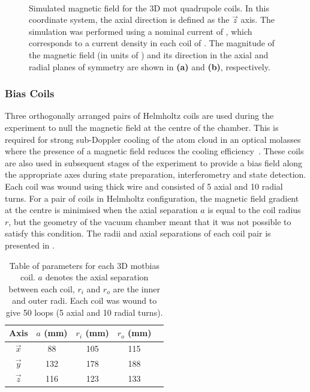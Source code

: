 \begin{figure}
	\centering
	\def\svgwidth{\columnwidth}
	\\
	\caption[Simulated magnetic field for the 3D \ac{mot} quadrupole
		coils]{Simulated magnetic field for the 3D \ac{mot} quadrupole coils. In
		this coordinate system, the axial direction is defined as the
		\(\vec{z}\) axis. The simulation was performed using a nominal current
		of , which corresponds to a current density in
		each coil of . The
		magnitude of the magnetic field (in units of \sivalue{}{\gauss}) and its
		direction in the axial and radial planes of symmetry are shown in
		\textbf{(a)} and
		\textbf{(b)}, respectively.}
	\label{fig:3D_mot_field_sim}
\end{figure}
\subsubsection{Bias Coils}
Three orthogonally arranged pairs of Helmholtz coils are used during the
experiment to null the magnetic field at the centre of the chamber. This is
required for strong sub-Doppler cooling of the atom cloud in an optical molasses
where the presence of a magnetic field reduces the cooling
efficiency~\cite{Walhout1992}. These coils are also used in subsequent stages of
the experiment to provide a bias field along the appropriate axes during state
preparation, interferometry and state detection. Each coil was wound using
 thick wire and consisted of 5 axial and 10 radial
turns. For a pair of coils in Helmholtz configuration, the magnetic field
gradient at the centre is minimised when the axial separation \(a\) is equal to
the coil radius \(r\), but the geometry of the vacuum chamber meant that it was
not possible to satisfy this condition. The radii and axial separations of each
coil pair is presented in .\begin{table}
	\begin{tabular}{|c|c|c|c|c|}
		\hline
		Axis        & \(a\) (mm) & \(r_i\) (mm) & \(r_o\) (mm) \\
		\hline
		\(\vec{x}\) & 88         & 105          & 115          \\
		\(\vec{y}\) & 132        & 178          & 188          \\
		\(\vec{z}\) & 116        & 123          & 133          \\
		\hline
	\end{tabular}
	\caption[Table of parameters for each 3D \ac{mot} bias coil.]{Table of
		parameters for each 3D \ac{mot}bias coil. \(a\) denotes the axial
		separation between each coil, \(r_i\) and \(r_o\) are the inner and
		outer radi. Each coil was wound to give 50 loops (5 axial and 10 radial
		turns).}
	\label{tab:bias_coils}
\end{table}

